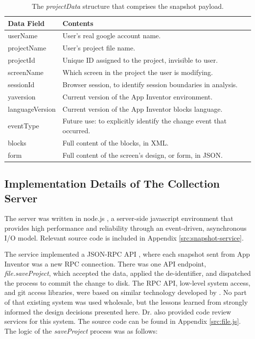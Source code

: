\begin{table}
\begin{centering}
	\begin{tabular}{l l}
		Data Field 			& Contents \\ \hline
		userName  			& User's real google account name. \\
		projectName 		& User's project file name. 	\\
		projectId 			& Unique ID assigned to the project, invisible to user.	\\
		screenName 			& Which screen in the project the user is modifying.	\\
		sessionId 			& Browser session, to identify session boundaries in analysis.	\\
		yaversion 			& Current version of the App Inventor environment. 	\\
		languageVersion 	& Current version of the App Inventor blocks language. 	\\
		eventType 			& Future use: to explicitly identify the change event that occurred. 	\\
		blocks 				& Full content of the blocks, in XML. 	\\
		form 				& Full content of the screen's design, or form, in JSON.

	\end{tabular}
	\caption{The \emph{projectData} structure that comprises the snapshot payload.}
	\label{tab:snapshotPayload}
\end{centering}
\end{table}

\subsection{Implementation Details of The Collection Server}
The server was written in node.js \citep{nodejs}, a server-side javascript environment that provides high performance and reliability through an event-driven, asynchronous I/O model. Relevant source code is included in Appendix \ref{src:snapshot-service}.

The service implemented a JSON-RPC API \citep{jsonrpc}, where each snapshot sent from App Inventor was a new RPC connection. There was one API endpoint, \emph{file.saveProject}, which accepted the data, applied the de-identifier, and dispatched the process to commit the change to disk. The RPC API, low-level system access, and git access libraries, were based on similar technology developed by \citet{lipman-2011}. No part of that existing system was used wholesale, but the lessons learned from \citet{lipman-2014} strongly informed the design decisions presented here. Dr. \citeauthor{lipman-2014} also provided code review services for this system. The source code can be found in Appendix \ref{src:file.js}. The logic of the \emph{saveProject} process was as follows:


